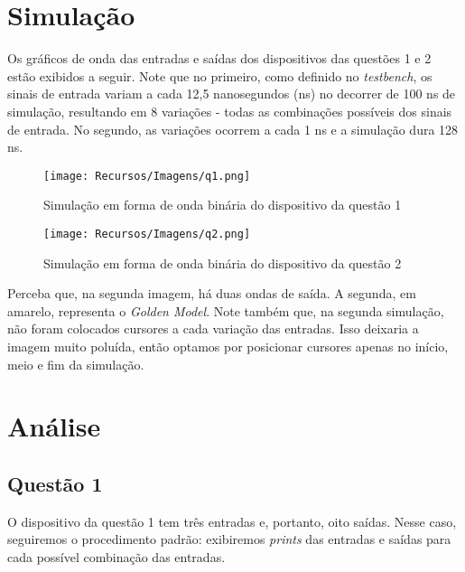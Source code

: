 \documentclass[a4paper,12pt]{article}
\begin{document}
\newpage

\section{Simulação}
Os gráficos de onda das entradas e saídas dos dispositivos das questões 1 e 2 estão exibidos a seguir. Note que no primeiro, como definido no \textit{testbench}, os sinais de entrada variam a cada 12,5 nanosegundos (ns) no decorrer de 100 ns de simulação, resultando em 8 variações - todas as combinações possíveis dos sinais de entrada. No segundo, as variações ocorrem a cada 1 ns e a simulação dura 128 ns.

\begin{figure}[H]
    \centering
    \begin{tcolorbox}[colframe=cinza, colback=white, boxrule=0.75pt, arc=0pt, width=1\textwidth, center, boxsep=0pt, left=0pt, right=0pt, top=0pt, bottom=0pt]
    \texttt{[image: Recursos/Imagens/q1.png]}
    \end{tcolorbox}
    \caption{Simulação em forma de onda binária do dispositivo da questão 1}
\end{figure}

\begin{figure}[H]
    \centering
    \begin{tcolorbox}[colframe=cinza, colback=white, boxrule=0.75pt, arc=0pt, width=1\textwidth, center, boxsep=0pt, left=0pt, right=0pt, top=0pt, bottom=0pt]
    \texttt{[image: Recursos/Imagens/q2.png]}
    \end{tcolorbox}
    \caption{Simulação em forma de onda binária do dispositivo da questão 2}
    \label{fig: q2}
\end{figure}

Perceba que, na segunda imagem, há duas ondas de saída. A segunda, em amarelo, representa o \textit{Golden Model}. Note também que, na segunda simulação, não foram colocados cursores a cada variação das entradas. Isso deixaria a imagem muito poluída, então optamos por posicionar cursores apenas no início, meio e fim da simulação.

\newpage

\section{Análise}

\subsection{Questão 1}
O dispositivo da questão 1 tem três entradas e, portanto, oito saídas. Nesse caso, seguiremos o procedimento padrão: exibiremos \textit{prints} das entradas e saídas para cada possível combinação das entradas.
\end{document}
